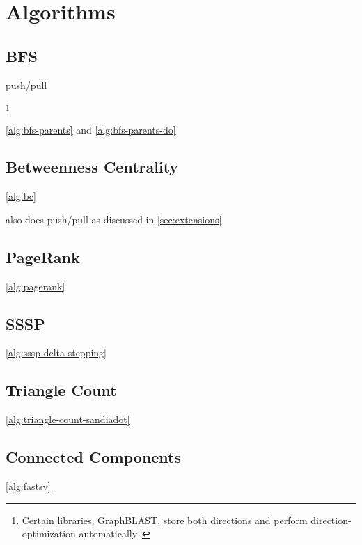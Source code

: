\section{Algorithms}
\label{sec:algorithms}

\subsection{BFS}

push/pull~\cite{DBLP:conf/icpp/YangBO18}

\footnote{Certain \grb libraries, \eg GraphBLAST, store both directions and perform direction-optimization automatically~\cite{DBLP:journals/corr/abs-1908-01407}}



\autoref{alg:bfs-parents} and \autoref{alg:bfs-parents-do}

\subsection{Betweenness Centrality}



\autoref{alg:bc}

also does push/pull as discussed in \autoref{sec:extensions}

\subsection{PageRank}




\autoref{alg:pagerank}


\subsection{SSSP}



\autoref{alg:sssp-delta-stepping}

\subsection{Triangle Count}



\autoref{alg:triangle-count-sandiadot}

\subsection{Connected Components}



\autoref{alg:fastsv}
